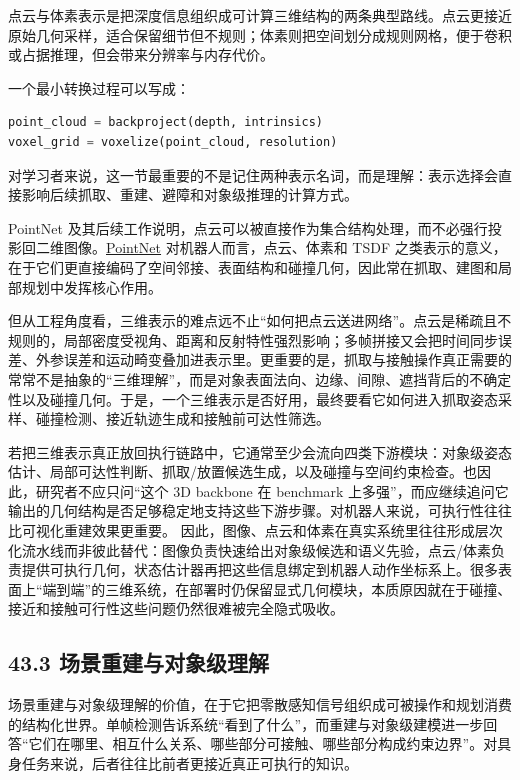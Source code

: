 点云与体素表示是把深度信息组织成可计算三维结构的两条典型路线。点云更接近原始几何采样，适合保留细节但不规则；体素则把空间划分成规则网格，便于卷积或占据推理，但会带来分辨率与内存代价。

一个最小转换过程可以写成：

\begin{lstlisting}[language=python]
point_cloud = backproject(depth, intrinsics)
voxel_grid = voxelize(point_cloud, resolution)
\end{lstlisting}

对学习者来说，这一节最重要的不是记住两种表示名词，而是理解：表示选择会直接影响后续抓取、重建、避障和对象级推理的计算方式。

PointNet 及其后续工作说明，点云可以被直接作为集合结构处理，而不必强行投影回二维图像。\href{https://arxiv.org/abs/1612.00593}{PointNet} 对机器人而言，点云、体素和 TSDF 之类表示的意义，在于它们更直接编码了空间邻接、表面结构和碰撞几何，因此常在抓取、建图和局部规划中发挥核心作用。

但从工程角度看，三维表示的难点远不止“如何把点云送进网络”。点云是稀疏且不规则的，局部密度受视角、距离和反射特性强烈影响；多帧拼接又会把时间同步误差、外参误差和运动畸变叠加进表示里。更重要的是，抓取与接触操作真正需要的常常不是抽象的“三维理解”，而是对象表面法向、边缘、间隙、遮挡背后的不确定性以及碰撞几何。于是，一个三维表示是否好用，最终要看它如何进入抓取姿态采样、碰撞检测、接近轨迹生成和接触前可达性筛选。

若把三维表示真正放回执行链路中，它通常至少会流向四类下游模块：对象级姿态估计、局部可达性判断、抓取/放置候选生成，以及碰撞与空间约束检查。也因此，研究者不应只问“这个 3D backbone 在 benchmark 上多强”，而应继续追问它输出的几何结构是否足够稳定地支持这些下游步骤。对机器人来说，可执行性往往比可视化重建效果更重要。 因此，图像、点云和体素在真实系统里往往形成层次化流水线而非彼此替代：图像负责快速给出对象级候选和语义先验，点云/体素负责提供可执行几何，状态估计器再把这些信息绑定到机器人动作坐标系上。很多表面上“端到端”的三维系统，在部署时仍保留显式几何模块，本质原因就在于碰撞、接近和接触可行性这些问题仍然很难被完全隐式吸收。

\subsection*{43.3 场景重建与对象级理解}


场景重建与对象级理解的价值，在于它把零散感知信号组织成可被操作和规划消费的结构化世界。单帧检测告诉系统“看到了什么”，而重建与对象级建模进一步回答“它们在哪里、相互什么关系、哪些部分可接触、哪些部分构成约束边界”。对具身任务来说，后者往往比前者更接近真正可执行的知识。

